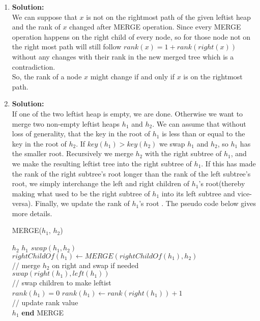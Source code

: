 \begin{enumerate}[label=(\alph*)]
	\item \textbf{Solution:} \\
	We can suppose that $x$ is not on the rightmost path of the given leftist heap and the rank of $x$ changed after MERGE operation. Since every MERGE operation happens on the right child of every node, so for those node not on the right most path will still follow $rank(x) = 1 + rank(right(x))$ without any changes with their rank in the new merged tree which is a contradiction.\\
	So, the rank of a node $x$ might change if and only if $x$ is on the rightmost path.

	\item \textbf{Solution:} \\
	If one of the two leftist heap is empty, we are done. Otherwise we want to merge two non-empty leftist heaps $h_1$ and $h_2$. We can assume that without loss of generality, that the key in the root of $h_1$ is less than or equal to the key in the root of $h_2$. If $key(h_1) > key(h_2)$ we swap $h_1$ and $h_2$, so $h_1$ has the smaller root. Recursively we merge $h_2$ with the right subtree of $h_1$, and we make the resulting leftist tree into the right subtree of $h_1$. If this has made the rank of the right subtree's root longer than the rank of the left subtree's root, we simply interchange the left and right children of $h_1$'s root(thereby making what used to be the right subtree of $h_1$ into its left subtree and vice-versa). Finally, we update the rank of $h_1$'s root . The pseudo code below gives more details. 
	\begin{algorithm}
	\caption{MERGE($h_1$, $h_2$)}\label{euclid}
	\begin{algorithmic}
	 \Return $h_2$
	 \Return $h_1$
	\Else
		\State $swap(h_1, h_2)$
		\EndIf
		$rightChildOf(h_1) \gets MERGE(rightChildOf(h_1), h_2) $ \\
		// merge $h_2$ on right and swap if needed \\
		\State $swap(right(h_1), left(h_1))$ \\
		// swap children to make leftist \\
		\EndIf
		\State $rank(h_1) = 0$
		\Else
		\State $rank(h_1) \gets rank(right(h_1)) + 1$ \\
		// update rank value \\
		\EndIf
		\Return $h_1$
	\EndIf
	\State \textbf{end} MERGE
	\end{algorithmic}
	\end{algorithm}


\end{enumerate}
